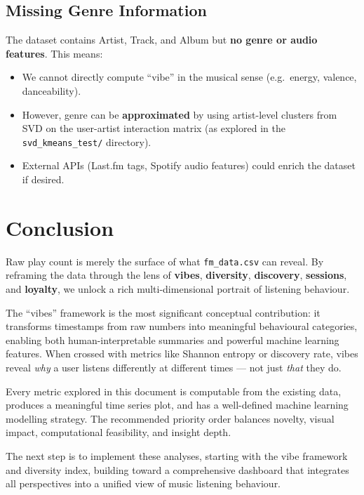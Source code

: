 \documentclass[12pt, a4paper]{article}
\begin{document}
\subsection{Missing Genre Information}

The dataset contains Artist, Track, and Album but \textbf{no genre or audio
features}. This means:
\begin{itemize}
    \item We cannot directly compute ``vibe'' in the musical sense (e.g.\
          energy, valence, danceability).
    \item However, genre can be \textbf{approximated} by using artist-level
          clusters from SVD on the user-artist interaction matrix (as
          explored in the \texttt{svd\_kmeans\_test/} directory).
    \item External APIs (Last.fm tags, Spotify audio features) could enrich
          the dataset if desired.
\end{itemize}

\section{Conclusion}

Raw play count is merely the surface of what \texttt{fm\_data.csv} can
reveal. By reframing the data through the lens of \textbf{vibes},
\textbf{diversity}, \textbf{discovery}, \textbf{sessions}, and
\textbf{loyalty}, we unlock a rich multi-dimensional portrait of listening
behaviour.

The ``vibes'' framework is the most significant conceptual contribution:
it transforms timestamps from raw numbers into meaningful behavioural
categories, enabling both human-interpretable summaries and powerful
machine learning features. When crossed with metrics like Shannon entropy
or discovery rate, vibes reveal \emph{why} a user listens differently at
different times --- not just \emph{that} they do.

Every metric explored in this document is computable from the existing data,
produces a meaningful time series plot, and has a well-defined machine
learning modelling strategy. The recommended priority order balances
novelty, visual impact, computational feasibility, and insight depth.

The next step is to implement these analyses, starting with the vibe
framework and diversity index, building toward a comprehensive dashboard
that integrates all perspectives into a unified view of music listening
behaviour.

\end{document}
